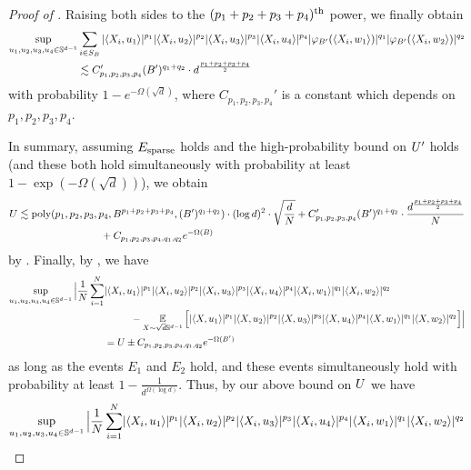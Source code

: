 \begin{proof}[Proof of ]
Raising both sides to the $(p_1 + p_2 + p_3 + p_4)^{\textup{th}}$ power, we finally obtain
\begin{align}
\sup_{u_1, u_2, u_3, u_4 \in \mathbb{S}^{d - 1}}&  \sum_{i \in S_B} |\langle X_i, u_1 \rangle|^{p_1} |\langle X_i, u_2 \rangle|^{p_2} |\langle X_i, u_3 \rangle|^{p_3} |\langle X_i, u_4 \rangle|^{p_4}  |{\varphi_{B'}}(\langle X_i, w_1 \rangle)|^{q_1} |{\varphi_{B'}}(\langle X_i, w_2 \rangle)|^{q_2} \\
& \lesssim C_{p_1, p_2, p_3, p_4}' (B')^{q_1 + q_2} \cdot d^{\frac{p_1 + p_2 + p_3 + p_4}{2}}
\end{align}
with probability $1 - e^{-\Omega(\sqrt{d})}$, where $C_{p_1, p_2, p_3, p_4}'$ is a constant which depends on $p_1, p_2, p_3, p_4$.

In summary, assuming ${E_{\textup{sparse}}}$ holds and the high-probability bound on ${U'}$ holds (and these both hold simultaneously with probability at least $1 - \exp(-\Omega(\sqrt{d}))$), we obtain
\begin{align}
U
& \lesssim \textup{poly}(p_1, p_2, p_3, p_4, B^{p_1 + p_2 + p_3 + p_4}, (B')^{q_1 + q_2}) \cdot (\log d)^2 \cdot \sqrt{\frac{d}{N}} + C_{p_1, p_2, p_3, p_4}' (B')^{q_1 + q_2} \cdot \frac{d^{\frac{p_1 + p_2 + p_3 + p_4}{2}}}{N} \\
& \,\,\,\,\,\,\,\,\,\,\,\,\,\,\,\,\,\,\,\,\,\,\,\,\,\,\,\,\,\,\,\,\,\,\,\,\,\,\,\,\,\,\,\,\,\,\,\, + C_{p_1, p_2, p_3, p_4, q_1, q_2} e^{-\Omega(B)}
\end{align}
by . Finally, by , we have
\begin{align}
\sup_{u_1, u_2, u_3, u_4 \in \mathbb{S}^{d - 1}} \Big|\frac{1}{N} \sum_{i = 1}^N & |\langle X_i, u_1 \rangle|^{p_1} |\langle X_i, u_2 \rangle|^{p_2} |\langle X_i, u_3 \rangle|^{p_3} |\langle X_i, u_4 \rangle|^{p_4} |\langle X_i, w_1 \rangle|^{q_1} |\langle X_i, w_2 \rangle|^{q_2} \\
& \,\,\,\,\,\,\,\,\,\,\,\,\,\,\,\, - \operatorname*{\mathbb{E}}_{X \sim \sqrt{d} \mathbb{S}^{d - 1}} \Big[ |\langle X, u_1 \rangle|^{p_1} |\langle X, u_2 \rangle|^{p_2} |\langle X, u_3 \rangle|^{p_3} |\langle X, u_4 \rangle|^{p_4} |\langle X, w_1 \rangle|^{q_1} |\langle X, w_2 \rangle|^{q_2} \Big] \Big| \\
& = U \pm C_{p_1, p_2, p_3, p_4, q_1, q_2} e^{-\Omega(B')}
\end{align}
as long as the events $E_1$ and $E_2$ hold, and these events simultaneously hold with probability at least $1 - \frac{1}{d^{\Omega(\log d)}}$. Thus, by our above bound on $U$ we have
\begin{align}
\sup_{u_1, u_2, u_3, u_4 \in \bbS^{d - 1}} \Big|\frac{1}{N} \sum_{i = 1}^N & |\langle X_i, u_1 \rangle|^{p_1} |\langle X_i, u_2 \rangle|^{p_2} |\langle X_i, u_3 \rangle|^{p_3} |\langle X_i, u_4 \rangle|^{p_4} |\langle X_i, w_1 \rangle|^{q_1} |\langle X_i, w_2 \rangle|^{q_2} \\

\end{align}
\end{proof}
